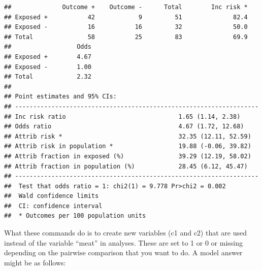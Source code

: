 \documentclass[]{book}
\newenvironment{Shaded}{\begin{snugshade}}{\end{snugshade}}
\newcommand{\CommentTok}[1]{\textcolor[rgb]{0.56,0.35,0.01}{\textit{#1}}}
\newcommand{\DataTypeTok}[1]{\textcolor[rgb]{0.13,0.29,0.53}{#1}}
\newcommand{\DecValTok}[1]{\textcolor[rgb]{0.00,0.00,0.81}{#1}}
\newcommand{\KeywordTok}[1]{\textcolor[rgb]{0.13,0.29,0.53}{\textbf{#1}}}
\newcommand{\NormalTok}[1]{#1}
\newcommand{\OperatorTok}[1]{\textcolor[rgb]{0.81,0.36,0.00}{\textbf{#1}}}
\newcommand{\StringTok}[1]{\textcolor[rgb]{0.31,0.60,0.02}{#1}}
\begin{document}
\begin{Shaded}
\end{Shaded}

\begin{verbatim}
##              Outcome +    Outcome -      Total        Inc risk *
## Exposed +           42            9         51              82.4
## Exposed -           16           16         32              50.0
## Total               58           25         83              69.9
##                  Odds
## Exposed +        4.67
## Exposed -        1.00
## Total            2.32
## 
## Point estimates and 95% CIs:
## -------------------------------------------------------------------
## Inc risk ratio                               1.65 (1.14, 2.38)
## Odds ratio                                   4.67 (1.72, 12.68)
## Attrib risk *                                32.35 (12.11, 52.59)
## Attrib risk in population *                  19.88 (-0.06, 39.82)
## Attrib fraction in exposed (%)               39.29 (12.19, 58.02)
## Attrib fraction in population (%)            28.45 (6.12, 45.47)
## -------------------------------------------------------------------
##  Test that odds ratio = 1: chi2(1) = 9.778 Pr>chi2 = 0.002
##  Wald confidence limits
##  CI: confidence interval
##  * Outcomes per 100 population units
\end{verbatim}

What these commands do is to create new variables (c1 and c2) that are
used instead of the variable ``meat'' in analyses. These are set to 1 or
0 or missing depending on the pairwise comparison that you want to do. A
model answer might be as follows:
\end{document}

